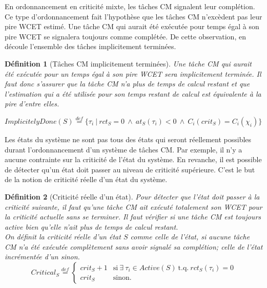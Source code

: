 \documentclass[12pt,a4paper,oneside]{book}
\theoremstyle{break}
\newtheorem{defin}{Définition}[chapter]
\theoremstyle{breakplain}
\begin{document}
En ordonnancement en criticité mixte, les tâches CM signalent leur complétion. Ce type d'ordonnancement fait l'hypothèse que les tâches CM n'excèdent pas leur pire WCET estimé. Une tâche CM qui aurait été exécutée pour temps égal à son pire WCET se signalera toujours comme complétée. De cette observation, en découle l'ensemble des tâches implicitement terminées.\\

\begin{defin}[Tâches CM implicitement terminées]
\label{per:impdone}
Une tâche CM qui aurait été exécutée pour un temps égal à son pire WCET sera implicitement terminée. Il faut donc s'assurer que la tâche CM n'a plus de temps de calcul restant et que l'estimation qui a été utilisée pour son temps restant de calcul est équivalente à la pire d'entre elles.

\begin{center}
$ImplicitelyDone(S) \overset{def}{=} \{\tau_i\ |\ rct_S = 0\ \wedge\ at_S(\tau_i) < 0\ \wedge\ C_i(crit_S)=C_i(\chi_i)\}$\\
\end{center}

\end{defin}
Les états du système ne sont pas tous des états qui seront réellement possibles durant l'ordonnancement d'un système de tâches CM. Par exemple, il n'y a aucune contrainte sur la criticité de l'état du système. En revanche, il est possible de détecter qu'un état doit passer au niveau de criticité supérieure. C'est le but de la notion de criticité réelle d'un état du système.

\begin{defin}[Criticité réelle d'un état]
Pour détecter que l'état doit passer à la criticité suivante, il faut qu'une tâche CM ait exécuté totalement son WCET pour la criticité actuelle sans se terminer. Il faut vérifier si une tâche CM est toujours active bien qu'elle n'ait plus de temps de calcul restant.\\

On définit la criticité réelle d'un état $S$ comme celle de l'état, si aucune tâche CM n'a été exécutée complètement sans avoir signalé sa complétion; celle de l'état incrémentée d'un sinon.
$$
Critical_S \overset{def}{=} \left\{
    \begin{array}{ll}
        crit_S+1 & \mbox{si}\ \exists\ \tau_i \in Active(S)\ \mbox{t.q.}\ rct_S(\tau_i) = 0 \\
        crit_S & \mbox{sinon.}
    \end{array}
\right.
$$
\end{defin}
\end{document}
